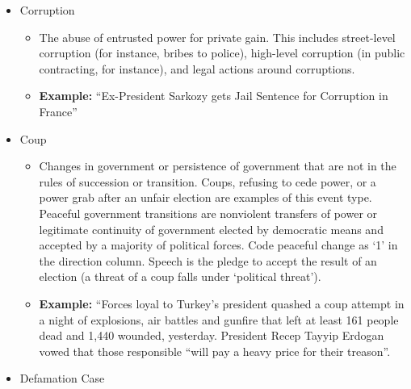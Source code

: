 \documentclass[
  letterpaper,
  DIV=11,
  numbers=noendperiod]{scrartcl}
\providecommand{\tightlist}{%
  \setlength{\itemsep}{0pt}\setlength{\parskip}{0pt}}\usepackage{longtable,booktabs,array}
\begin{document}
\begin{itemize}
  \begin{itemize}
  \tightlist
  \item
    The government actively prevents free speech by individuals in the
    media, in public or online. This includes banning certain content
    from individual speech or news stories, dictating how certain
    concepts or people can be referred to in public speech, or directly
    dictating agenda setting for media organizations. This category also
    includes the government censoring internet websites, internet
    shutdowns, fines on independent media, limitations on foreign
    ownership of media outlets, and political actors gaining influence
    within media organizations. Magnitude is a scale (see below; try to
    determine the importance of the target with information given).
  \item
    \textbf{Example:} ``The Tanzanian government has suspended newspaper
    The Citizen for seven days after the publication ran a story on the
    falling value of the Tanzanian shilling.''
  \end{itemize}
\item
  Corruption

  \begin{itemize}
  \tightlist
  \item
    The abuse of entrusted power for private gain. This includes
    street-level corruption (for instance, bribes to police), high-level
    corruption (in public contracting, for instance), and legal actions
    around corruptions.
  \item
    \textbf{Example:} ``Ex-President Sarkozy gets Jail Sentence for
    Corruption in France''
  \end{itemize}
\item
  Coup

  \begin{itemize}
  \tightlist
  \item
    Changes in government or persistence of government that are not in
    the rules of succession or transition. Coups, refusing to cede
    power, or a power grab after an unfair election are examples of this
    event type. Peaceful government transitions are nonviolent transfers
    of power or legitimate continuity of government elected by
    democratic means and accepted by a majority of political forces.
    Code peaceful change as `1' in the direction column. Speech is the
    pledge to accept the result of an election (a threat of a coup falls
    under `political threat').
  \item
    \textbf{Example:} ``Forces loyal to Turkey's president quashed a
    coup attempt in a night of explosions, air battles and gunfire that
    left at least 161 people dead and 1,440 wounded, yesterday.
    President Recep Tayyip Erdogan vowed that those responsible ``will
    pay a heavy price for their treason''.
  \end{itemize}
\item
  Defamation Case


\end{itemize}
\end{document}
